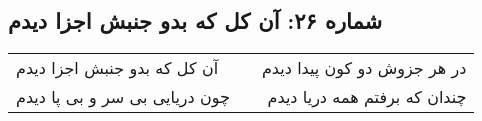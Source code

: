 \begin{center}
\section*{شماره ۲۶: آن کل که بدو جنبش اجزا دیدم}
\label{sec:026}
\begin{longtable}{l p{0.5cm} r}
آن کل که بدو جنبش اجزا دیدم
&&
در هر جزوش دو کون پیدا دیدم
\\
چون دریایی بی سر و بی پا دیدم
&&
چندان که برفتم همه دریا دیدم
\\
\end{longtable}
\end{center}
